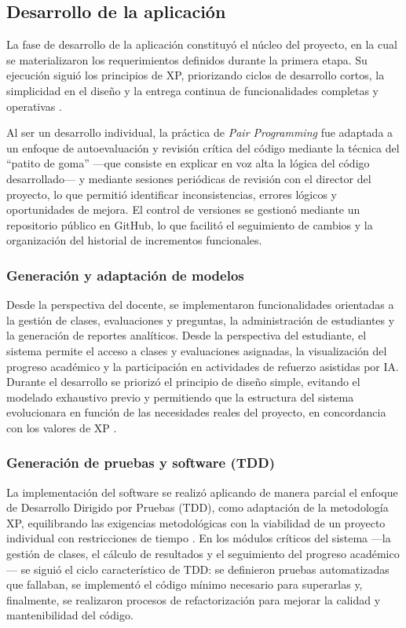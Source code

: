 \subsection{Desarrollo de la aplicación}

La fase de desarrollo de la aplicación constituyó el núcleo del proyecto, en la cual se materializaron los requerimientos definidos durante la primera etapa. Su ejecución siguió los principios de XP, priorizando ciclos de desarrollo cortos, la simplicidad en el diseño y la entrega continua de funcionalidades completas y operativas \cite{dyba2008agile}.

Al ser un desarrollo individual, la práctica de \textit{Pair Programming} fue adaptada a un enfoque de autoevaluación y revisión crítica del código mediante la técnica del ``patito de goma'' —que consiste en explicar en voz alta la lógica del código desarrollado— y mediante sesiones periódicas de revisión con el director del proyecto, lo que permitió identificar inconsistencias, errores lógicos y oportunidades de mejora. El control de versiones se gestionó mediante un repositorio público en GitHub, lo que facilitó el seguimiento de cambios y la organización del historial de incrementos funcionales.

\subsubsection{Generación y adaptación de modelos}

Desde la perspectiva del docente, se implementaron funcionalidades orientadas a la gestión de clases, evaluaciones y preguntas, la administración de estudiantes y la generación de reportes analíticos. Desde la perspectiva del estudiante, el sistema permite el acceso a clases y evaluaciones asignadas, la visualización del progreso académico y la participación en actividades de refuerzo asistidas por IA. Durante el desarrollo se priorizó el principio de diseño simple, evitando el modelado exhaustivo previo y permitiendo que la estructura del sistema evolucionara en función de las necesidades reales del proyecto, en concordancia con los valores de XP \cite{beck2004xp,shrivastava2021xpreview}.

\subsubsection{Generación de pruebas y software (TDD)}

La implementación del software se realizó aplicando de manera parcial el enfoque de Desarrollo Dirigido por Pruebas (TDD), como adaptación de la metodología XP, equilibrando las exigencias metodológicas con la viabilidad de un proyecto individual con restricciones de tiempo \cite{dyba2008agile}. En los módulos críticos del sistema ---la gestión de clases, el cálculo de resultados y el seguimiento del progreso académico--- se siguió el ciclo característico de TDD: se definieron pruebas automatizadas que fallaban, se implementó el código mínimo necesario para superarlas y, finalmente, se realizaron procesos de refactorización para mejorar la calidad y mantenibilidad del código.

